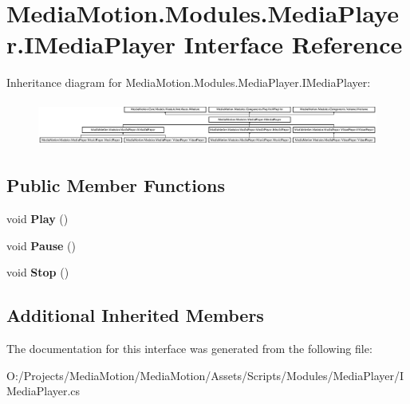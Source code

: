 \hypertarget{interface_media_motion_1_1_modules_1_1_media_player_1_1_i_media_player}{\section{Media\+Motion.\+Modules.\+Media\+Player.\+I\+Media\+Player Interface Reference}
\label{interface_media_motion_1_1_modules_1_1_media_player_1_1_i_media_player}
}
Inheritance diagram for Media\+Motion.\+Modules.\+Media\+Player.\+I\+Media\+Player\+:\begin{figure}[H]
\begin{center}
\leavevmode
\includegraphics[height=1.497326cm]{interface_media_motion_1_1_modules_1_1_media_player_1_1_i_media_player}
\end{center}
\end{figure}
\subsection*{Public Member Functions}
\begin{DoxyCompactItemize}
\item 
\hypertarget{interface_media_motion_1_1_modules_1_1_media_player_1_1_i_media_player_a12c368634719c16e27feb122122f25c0}{void {\bfseries Play} ()}\label{interface_media_motion_1_1_modules_1_1_media_player_1_1_i_media_player_a12c368634719c16e27feb122122f25c0}

\item 
\hypertarget{interface_media_motion_1_1_modules_1_1_media_player_1_1_i_media_player_a05c231b1472396b15139ceb3ed247681}{void {\bfseries Pause} ()}\label{interface_media_motion_1_1_modules_1_1_media_player_1_1_i_media_player_a05c231b1472396b15139ceb3ed247681}

\item 
\hypertarget{interface_media_motion_1_1_modules_1_1_media_player_1_1_i_media_player_ad77f5fa21bce376e2dd8f9b9068088f6}{void {\bfseries Stop} ()}\label{interface_media_motion_1_1_modules_1_1_media_player_1_1_i_media_player_ad77f5fa21bce376e2dd8f9b9068088f6}

\end{DoxyCompactItemize}
\subsection*{Additional Inherited Members}


The documentation for this interface was generated from the following file\+:\begin{DoxyCompactItemize}
\item 
O\+:/\+Projects/\+Media\+Motion/\+Media\+Motion/\+Assets/\+Scripts/\+Modules/\+Media\+Player/I\+Media\+Player.\+cs\end{DoxyCompactItemize}
